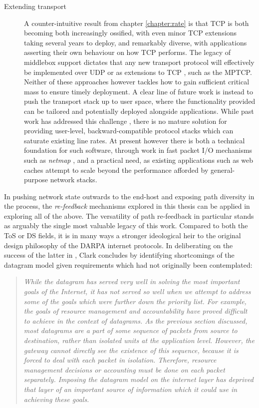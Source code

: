 \begin{description}
\item[Extending transport]{
A counter-intuitive result from chapter \ref{chapter:rate} is that \ac{TCP} is both becoming both increasingly ossified, with even minor \ac{TCP} extensions taking several years to deploy, and remarkably diverse, with applications asserting their own behaviour on how \ac{TCP} performs.
The legacy of middlebox support dictates that any new transport protocol will effectively be implemented over \acs{UDP} or as extensions to \ac{TCP} \cite{Honda11}, such as the \ac{MPTCP}.
Neither of these approaches however tackles how to gain sufficient critical mass to ensure timely deployment.
A clear line of future work is instead to push the transport stack up to user space, where the functionality provided can be tailored and potentially deployed alongside applications.
While past work has addressed this challenge \cite{Thekkath93,sctpuser}, there is no mature solution for providing user-level, backward-compatible protocol stacks which can saturate existing line rates. 
At present however there is both a technical foundation for such software, through work in fast packet \acs{I/O} mechanisms such as \emph{netmap} \cite{Rizzo12acmq}, and a practical need, as existing applications such as web caches attempt to scale beyond the performance afforded by general-purpose network stacks.
}
\end{description}

In pushing network state outwards to the end-host and exposing path diversity in the process, the \emph{re-feedback} mechanisms explored in this thesis can be applied in exploring all of the above.
The versatility of path re-feedback in particular stands as arguably the single most valuable legacy of this work.
Compared to both the \ac{ToS} or \ac{DS} fields, it is in many ways a stronger ideological heir to the original design philosophy of the \acs{DARPA} internet protocols.
In deliberating on the success of the latter in \cite{Clark:1988p478}, Clark concludes by identifying shortcomings of the datagram model given requirements which had not originally been contemplated:

\begin{quote}
\textit{While the datagram has served very well in solving the most important goals of the Internet, it has not served so well when we attempt to address some of the goals which were further down the priority list. 
For example, the goals of resource management and accountability have proved difficult to achieve in the context of datagrams.
As the previous section discussed, most datagrams are a part of some sequence of packets from source to destination, rather than isolated units at the application level.  
However, the gateway cannot directly see the existence of this sequence, because it is forced to deal with each packet in isolation.  
Therefore, resource management decisions or accounting must be done on each packet separately.  
Imposing the datagram model on the internet layer has deprived that layer of an important source of information which it could use in achieving these goals.}
\end{quote}

